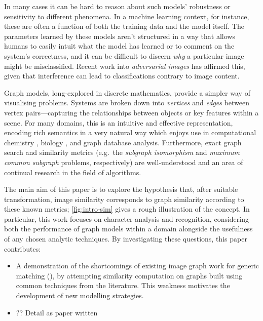 \documentclass{mpaper}
\begin{document}
In many cases it can be hard to reason about such models' robustness or sensitivity to different phenomena.
In a machine learning context, for instance, these are often a function of both the training data and the model itself.
The parameters learned by these models aren't structured in a way that allows humans to easily intuit what the model has learned or to comment on the system's correctness, and it can be difficult to discern \textit{why} a particular image might be misclassified.
Recent work into \emph{adversarial images} \cite{AdversarialML} has affirmed this, given that interference can lead to classifications contrary to image content.


Graph models, long-explored in discrete mathematics, provide a simpler way of visualising problems.
Systems are broken down into \emph{vertices} and \emph{edges} between vertex pairs---capturing the relationships between objects or key features within a scene.
For many domains, this is an intuitive and effective representation, encoding rich semantics in a very natural way which enjoys use in computational chemistry \cite{Graph-Molecules-2,Graph-Molecules-3,Graph-Molecules-1}, biology \cite{Graph-Biology-1}, and graph database analysis.
Furthermore, exact graph search and similarity metrics (e.g.\ the \emph{subgraph isomorphism} and \emph{maximum common subgraph} problems, respectively) are well-understood and an area of continual research in the field of algorithms.

The main aim of this paper is to explore the hypothesis that, after suitable transformation, image similarity corresponds to graph similarity according to these known metrics; \cref{fig:intro-sim} gives a rough illustration of the concept.
In particular, this work focuses on character analysis and recognition, considering both the performance of graph models within a domain alongside the usefulness of any chosen analytic techniques.
By investigating these questions, this paper contributes:
\begin{itemize}
	\item A demonstration of the shortcomings of existing image graph work for generic matching (), by attempting similarity computation on graphs built using common techniques from the literature. %
	This weakness motivates the development of new modelling strategies.
	\item ?? Detail as paper written
\end{itemize}
\end{document}
